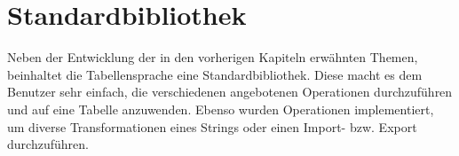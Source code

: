 \section{Standardbibliothek}
\label{sectionStandardBibliothek}
Neben der Entwicklung der in den vorherigen Kapiteln erwähnten Themen, beinhaltet die Tabellensprache eine Standardbibliothek. Diese macht es dem Benutzer sehr einfach, die verschiedenen angebotenen Operationen durchzuführen und auf eine Tabelle anzuwenden. Ebenso wurden Operationen implementiert, um diverse Transformationen eines Strings oder einen Import- bzw. Export durchzuführen.